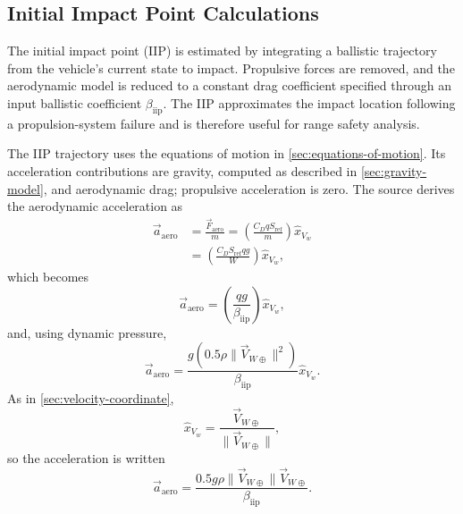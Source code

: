 \subsection{Initial Impact Point Calculations}\label{sec:iip-calculations}

The initial impact point (IIP) is estimated by integrating a ballistic trajectory from
the vehicle's current state to impact. Propulsive forces are removed, and the
aerodynamic model is reduced to a constant drag coefficient specified through an
input ballistic coefficient $\beta_{\mathrm{iip}}$. The IIP approximates the impact
location following a propulsion-system failure and is therefore useful for range
safety analysis.

The IIP trajectory uses the equations of motion in \cref{sec:equations-of-motion}.
Its acceleration contributions are gravity, computed as described in
\cref{sec:gravity-model}, and aerodynamic drag; propulsive acceleration is zero.
The source derives the aerodynamic acceleration as
\begin{equation}
\begin{aligned}
  \vec a_{\mathrm{aero}}
  &=\frac{\vec F_{\mathrm{aero}}}{m}
   =\left(\frac{C_DqS_{\mathrm{ref}}}{m}\right)\hat x_{V_w}\\
  &=\left(\frac{C_DS_{\mathrm{ref}}qg}{W}\right)\hat x_{V_w},
\end{aligned}
\label{eq:iip-aerodynamic-acceleration-coefficients}
\end{equation}
which becomes
\begin{equation}
  \vec a_{\mathrm{aero}}
  =\left(\frac{qg}{\beta_{\mathrm{iip}}}\right)\hat x_{V_w},
  \label{eq:iip-aerodynamic-acceleration-ballistic}
\end{equation}
and, using dynamic pressure,
\begin{equation}
  \vec a_{\mathrm{aero}}
  =\frac{g\left(0.5\rho\lVert\vec V_{W\oplus}\rVert^2\right)}
         {\beta_{\mathrm{iip}}}\hat x_{V_w}.
  \label{eq:iip-aerodynamic-acceleration-dynamic-pressure}
\end{equation}
As in \cref{sec:velocity-coordinate},
\begin{equation}
  \hat x_{V_w}
  =\frac{\vec V_{W\oplus}}{\lVert\vec V_{W\oplus}\rVert},
  \label{eq:iip-wind-velocity-unit-vector}
\end{equation}
so the acceleration is written
\begin{equation}
  \vec a_{\mathrm{aero}}
  =\frac{0.5g\rho\lVert\vec V_{W\oplus}\rVert\vec V_{W\oplus}}
         {\beta_{\mathrm{iip}}}.
  \label{eq:iip-aerodynamic-acceleration-vector}
\end{equation}

